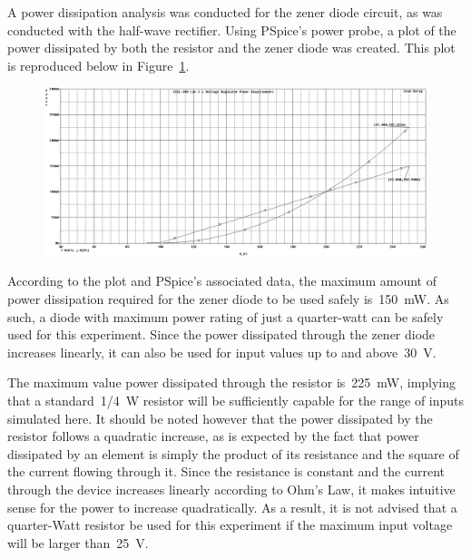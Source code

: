 A power dissipation analysis was conducted for the zener diode circuit, as was
conducted with the half-wave rectifier.  Using PSpice's power probe, a plot of
the power dissipated by both the resistor and the zener diode was created.
This plot is reproduced below in Figure~\ref{fig:zenerPlotW}.
%
\begin{figure}[H]
	\centering
	\includegraphics[width=\pwidth]{img/plot/zenerPowerPlot.PNG}
	\parbox{\pwidth}{
	\caption{}
	\label{fig:zenerPlotW}}
\end{figure}
%
According to the plot and PSpice's associated data, the maximum amount of power
dissipation required for the zener diode to be used safely
is~\SI{150}{\milli\watt}.  As such, a diode with maximum power rating of just a
quarter-watt can be safely used for this experiment.  Since the power
dissipated through the zener diode increases linearly, it can also be used for
input values up to and above~\SI{30}{\volt}.

The maximum value power dissipated through the resistor
is~\SI{225}{\milli\watt}, implying that a standard~\SI{1/4}{\watt} resistor
will be sufficiently capable for the range of inputs simulated here.  It should
be noted however that the power dissipated by the resistor follows a quadratic
increase, as is expected by the fact that power dissipated by an element is
simply the product of its resistance and the square of the current flowing
through it.  Since the resistance is constant and the current through the
device increases linearly according to Ohm's Law, it makes intuitive sense for
the power to increase quadratically.  As a result, it is not advised that a
quarter-Watt resistor be used for this experiment if the maximum input voltage
will be larger than~\SI{25}{\volt}.

